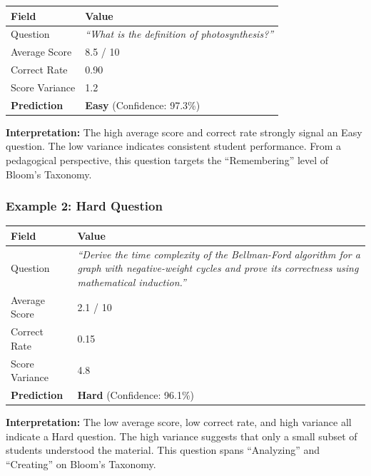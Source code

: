 \documentclass[12pt, a4paper, twoside]{article}
\begin{document}
\begin{center}
\renewcommand{\arraystretch}{1.2}
\begin{tabularx}{\textwidth}{l X}
    \toprule
    \textbf{Field} & \textbf{Value} \\
    \midrule
    Question & \emph{``What is the definition of photosynthesis?''} \\
    Average Score & 8.5 / 10 \\
    Correct Rate  & 0.90 \\
    Score Variance & 1.2 \\
    \midrule
    \textbf{Prediction} & \textcolor{easygreen}{\textbf{Easy}}
                          (Confidence: 97.3\%) \\
    \bottomrule
\end{tabularx}
\end{center}

\noindent \textbf{Interpretation:} The high average score and correct
rate strongly signal an Easy question. The low variance indicates
consistent student performance. From a pedagogical perspective, this
question targets the \enquote{Remembering} level of Bloom's Taxonomy.

\subsubsection{Example 2: Hard Question}

\begin{center}
\renewcommand{\arraystretch}{1.2}
\begin{tabularx}{\textwidth}{l X}
    \toprule
    \textbf{Field} & \textbf{Value} \\
    \midrule
    Question & \emph{``Derive the time complexity of the Bellman-Ford
               algorithm for a graph with negative-weight cycles and
               prove its correctness using mathematical induction.''} \\
    Average Score & 2.1 / 10 \\
    Correct Rate  & 0.15 \\
    Score Variance & 4.8 \\
    \midrule
    \textbf{Prediction} & \textcolor{hardred}{\textbf{Hard}}
                          (Confidence: 96.1\%) \\
    \bottomrule
\end{tabularx}
\end{center}

\noindent \textbf{Interpretation:} The low average score, low correct
rate, and high variance all indicate a Hard question. The high variance
suggests that only a small subset of students understood the material.
This question spans \enquote{Analyzing} and \enquote{Creating} on
Bloom's Taxonomy.
\end{document}
